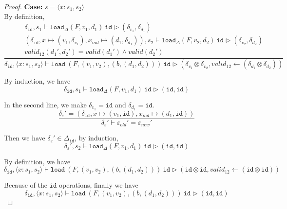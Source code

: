 \documentclass[10pt,twoside,a4paper]{article}
\theoremstyle{theorem}
\theoremstyle{lemma}
\theoremstyle{property}
\theoremstyle{definition}
\theoremstyle{assumption}
\def\id{\mathtt{id}}
\begin{document}
\begin{proof}
	\textbf{Case: } $s = \langle x : s_1, s_2 \rangle$\\

	By definition,
	\begin{displaymath}
	\frac{\begin{array}{c}
		\delta_{\id}, s_1 \vdash \mathtt{load}_\Delta (F,v_1,d_1)~ \id \rhd (\delta_{v_1},\delta_{d_1})\\
		(\delta_{\id}, x \mapsto (v_1, \delta_{v_1}), x_{md} \mapsto (d_1, \delta_{d_1})), s_2 \vdash \mathtt{load}_\Delta (F,v_2,d_2)~ \id \rhd (\delta_{v_2},\delta_{d_2})\\
		valid_{12}({d_1}',{d_2}') = valid({d_1}') \wedge valid({d_2}')
	\end{array}}
	{\delta_{\id}, \langle x:s_1,s_2 \rangle \vdash \mathtt{load}~ (F,(v_1,v_2),(b,(d_1,d_2)))~ \id \rhd (\delta_{v_1} \otimes \delta_{v_2},valid_{12} \leftarrow (\delta_{d_1} \otimes \delta_{d_2})) }
	\end{displaymath}

	By induction, we have
	\begin{displaymath}
		\delta_{\id}, s_1 \vdash \mathtt{load}_\Delta (F,v_1,d_1)~ \id \rhd (\id,\id)
	\end{displaymath}

	In the second line, we make $\delta_{v_1} = \id $ and $ \delta_{d_1} = \id$.
	\begin{displaymath}
	\frac{
		\delta_\varepsilon' = (\delta_{\id}, x \mapsto (v_1, \id), x_{md} \mapsto (d_1, \id))
	}
	{	\delta_\varepsilon' \vdash \varepsilon_{old}' = \varepsilon_{new}' }
	\end{displaymath}

	Then we have $\delta_\varepsilon' \in \Delta_{\id}$, by induction, 
	\begin{displaymath}
		\delta_\varepsilon', s_2 \vdash \mathtt{load}_\Delta (F,v_1,d_1)~ \id \rhd (\id,\id)
	\end{displaymath}

	By definition, we have
	\begin{displaymath}
		\delta_{\id}, \langle x:s_1,s_2 \rangle \vdash \mathtt{load}~ (F,(v_1,v_2),(b,(d_1,d_2)))~ \id \rhd (\id \otimes \id,valid_{12} \leftarrow (\id \otimes \id)) 
	\end{displaymath}

	Because of the $\id$ operations, finally we have
	\begin{displaymath}
		\delta_{\id}, \langle x:s_1,s_2 \rangle \vdash \mathtt{load}~ (F,(v_1,v_2),(b,(d_1,d_2)))~ \id \rhd (\id, \id) 
	\end{displaymath}


\end{proof}
\end{document}
